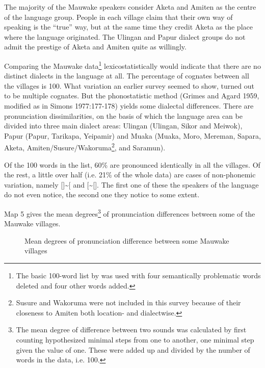 The majority of the Mauwake speakers consider Aketa and Amiten as the centre of the language group. People in each village claim that their own way of speaking is the ``true'' way, but at the same time they credit Aketa as the place where the language originated.  The Ulingan and Papur dialect groups do not admit the prestige of Aketa and Amiten quite as willingly.

Comparing the Mauwake data\footnote{The basic 100-word list by \citet[55-59]{Ezard1978} was used with four semantically problematic words deleted and four other words added.} lexicostatistically would indicate that there are no distinct dialects in the language at all. The percentage of cognates between all the villages is 100.  What variation an earlier survey seemed to show, turned out to be multiple cognates. But the phonostatistic method (Grimes and Agard 1959, modified as in Simons 1977:177-178) yields some dialectal differences. There are pronunciation dissimilarities, on the basis of which the language area can be divided into three main dialect areas: Ulingan (Ulingan, Sikor and Meiwok), Papur (Papur, Tarikapa, Yeipamir) and Muaka (Muaka, Moro, Mereman, Sapara, Aketa, Amiten/Susure/Wakoruma\footnote{Susure and Wakoruma were not included in this survey because of their closeness to Amiten both location- and dialectwise.}, and Saramun). 

Of the 100 words in the list, 60\% are pronounced identically in all the villages.  Of the rest, a little over half (i.e. 21\% of the whole data) are cases of non-phonemic variation, namely []\~{}[\emphs{$\beta $}\emphs{],} and [\emphs{j]}\~{}[\emphs{{\textyogh}}]. The first one of these the speakers of the language do not even notice, the second one they notice to some extent. 

Map 5 gives the mean degrees\footnote{The mean degree of difference between two sounds was calculated by first counting hypothesized minimal steps from one to another, one minimal step given the value of one. These were added up and divided by the number of words in the data, i.e. 100.} of pronunciation differences between some of the Mauwake villages. 



\begin{figure}
\caption{Mean degrees of pronunciation difference between some Mauwake villages}
\label{fig:map:5}
\end{figure}

